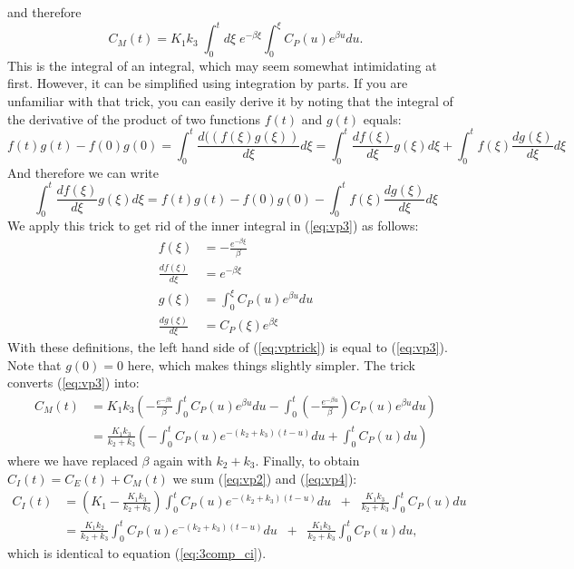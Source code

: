 \documentclass[11pt,oneside]{book}
\begin{document}
and therefore
\begin{equation}
  C_M(t) = K_1 k_3 \; \int_0^t d\xi \; e^{-\beta \xi} 
       \int_0^\xi  C_P(u) e^{\beta u} du.   \label{eq:vp3}
\end{equation}
This is the integral of an integral, which may seem somewhat
intimidating at first. However, it can be simplified using integration
by parts. If you are unfamiliar with that trick, you can easily derive
it by noting that the integral of the derivative of the product of two
functions $f(t)$ and $g(t)$ equals:
\begin{equation}
  f(t) g(t) - f(0) g(0) = \int_0^t \frac{d ((f(\xi) g(\xi))}{d\xi} d\xi
 = \int_0^t \frac{d f(\xi)}{d\xi} g(\xi) d\xi 
   +  \int_0^t f(\xi) \frac{d g(\xi)}{d\xi} d\xi
\end{equation}
And therefore we can write
\begin{equation}
  \int_0^t \frac{d f(\xi)}{d\xi} g(\xi) d\xi = f(t) g(t) - f(0) g(0)
        - \int_0^t f(\xi) \frac{d g(\xi)}{d\xi} d\xi \label{eq:vptrick}
\end{equation}
We apply this trick to get rid of the inner integral in (\ref{eq:vp3})
as follows:
\begin{align}
  f(\xi) &= -\frac{e^{-\beta \xi}}{\beta}\\
  \frac{d f(\xi)}{d\xi} &= e^{-\beta\xi}\\
  g(\xi) &= \int_0^\xi  C_P(u) e^{\beta u} du\\
  \frac{d g(\xi)}{d\xi} &= C_P(\xi) e^{\beta \xi}
\end{align}
With these definitions, the left hand side of (\ref{eq:vptrick}) is
equal to (\ref{eq:vp3}). Note that $g(0) = 0$ here, which makes things
slightly simpler.  The trick converts (\ref{eq:vp3}) into:
\begin{align}
 C_M(t) &= K_1 k_3 \left( 
  -\frac{e^{-\beta t}}{\beta} \int_0^t  C_P(u) e^{\beta u} du
  - \int_0^t (-\frac{e^{-\beta u}}{\beta}) C_P(u) e^{\beta u} du
   \right) \nonumber \\
 &= \frac{K_1 k_3}{k_2 + k_3} \left(
   - \int_0^t C_P(u) e^{-(k_2 + k_3) (t -u)} du + \int_0^t C_P(u) du
 \right) \label{eq:vp4}
\end{align}
where we have replaced $\beta$ again with $k_2 + k_3$.
Finally, to obtain $C_I(t) = C_E(t) + C_M(t)$ we sum (\ref{eq:vp2})
and (\ref{eq:vp4}):
\begin{align}
C_I(t) &= (K_1 - \frac{K_1 k_3}{k_2 + k_3}) 
            \int_0^t C_P(u) e^{- (k_2 + k_3) (t -u)} du \;\;
       + \;\; \frac{K_1 k_3}{k_2 + k_3} \int_0^t C_P(u) du \nonumber\\
 &=
  \frac{K_1 k_2}{k_2 + k_3} \int_0^t C_P(u) e^{- (k_2 + k_3) (t -u)} du
    \;\; + \;\;
   \frac{K_1 k_3}{k_2 + k_3} \int_0^t C_P(u) du,
\end{align}
which is identical to equation (\ref{eq:3comp_ci}).
\end{document}
